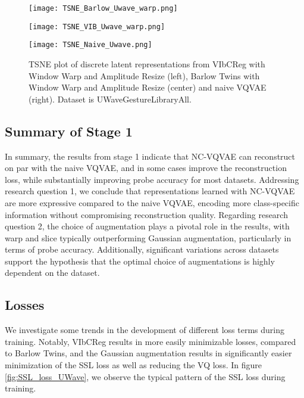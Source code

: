 \documentclass[../../thesis.tex]{subfiles}
\begin{document}
\begin{figure}[H]
    \centering
    \begin{minipage}[b]{0.32\textwidth}
        \centering
        \texttt{[image: TSNE\_Barlow\_Uwave\_warp.png]}
    \end{minipage}
    \hfill
    \begin{minipage}[b]{0.32\textwidth}
        \centering
        \texttt{[image: TSNE\_VIB\_Uwave\_warp.png]}
    \end{minipage}
    \hfill
    \begin{minipage}[b]{0.32\textwidth}
        \centering
        \texttt{[image: TSNE\_Naive\_Uwave.png]}
    \end{minipage}
    \caption{TSNE plot of discrete latent representations from VIbCReg with Window Warp and Amplitude Resize (left), Barlow Twins with Window Warp and Amplitude Resize (center) and naive VQVAE (right). Dataset is UWaveGestureLibraryAll.}
    \label{fig:TSNE_UWave}
\end{figure}

\subsection*{Summary of Stage 1}

In summary, the results from stage 1 indicate that NC-VQVAE can reconstruct on par with the naive VQVAE, and in some cases improve the reconstruction loss, while substantially improving probe accuracy for most datasets. Addressing research question 1, we conclude that representations learned with NC-VQVAE are more expressive compared to the naive VQVAE, encoding more class-specific information without compromising reconstruction quality. Regarding research question 2, the choice of augmentation plays a pivotal role in the results, with warp and slice typically outperforming Gaussian augmentation, particularly in terms of probe accuracy. Additionally, significant variations across datasets support the hypothesis that the optimal choice of augmentations is highly dependent on the dataset.

\subsection{Losses}

We investigate some trends in the development of different loss terms during training. Notably, VIbCReg results in more easily minimizable losses, compared to Barlow Twins, and the Gaussian augmentation results in significantly easier minimization of the SSL loss as well as reducing the VQ loss. In figure \ref{fig:SSL_loss_UWave}, we observe the typical pattern of the SSL loss during training.
\end{document}
